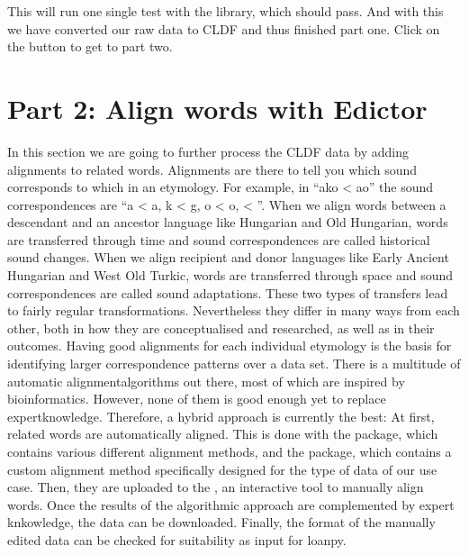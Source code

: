 \documentclass[letterpaper,10pt,english]{sphinxmanual}
\begin{document}
\sphinxAtStartPar
This will run one single test with the
 library, which should pass.
And with this we have converted our raw data to CLDF and thus finished part
one. Click on the \sphinxhyphen{}button to get to part two.

\sphinxstepscope


\chapter{Part 2: Align words with Edictor}
\label{\detokenize{mkedictor:part-2-align-words-with-edictor}}\label{\detokenize{mkedictor::doc}}
\sphinxAtStartPar
In this section we are going to further process the CLDF data by adding
alignments to related words. Alignments are there to tell you which sound
corresponds to which in an etymology. For example, in “a\textipa{:}ko \textless{} a\textipa{:}o” the
sound correspondences are “a\textipa{:} \textless{} a\textipa{:}, k \textless{} g, o \textless{} o,  \textless{} ”. When we align words
between a descendant and an ancestor language like Hungarian and Old
Hungarian, words are transferred through time and sound correspondences are
called historical sound changes. When we align recipient and donor languages
like Early Ancient Hungarian and West Old Turkic, words are transferred
through space and sound correspondences are called sound adaptations.
These two types of transfers lead to fairly regular transformations.
Nevertheless they differ in many ways from each other, both in how they are
conceptualised and researched, as well as in their outcomes. Having good
alignments for each individual etymology is the basis for identifying
larger correspondence patterns over a data set. There is a multitude of
automatic alignment\sphinxhyphen{}algorithms out there, most of which are inspired by
bioinformatics. However, none of them is good enough yet to replace
expert\sphinxhyphen{}knowledge. Therefore, a hybrid approach is currently the best:
At first, related words are automatically aligned. This is done with the
 package, which contains various different
alignment methods, and the 
package, which contains a custom alignment method specifically designed
for the type of data of our use case. Then, they are uploaded to the
, an interactive tool to manually
align words. Once the results of the algorithmic approach are complemented
by expert knkowledge, the data can be downloaded. Finally, the format of
the manually edited data can be checked for suitability as input for
loanpy.
\end{document}
